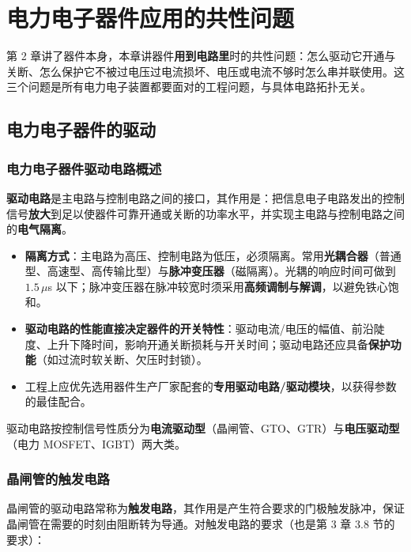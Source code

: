 \chapter{电力电子器件应用的共性问题}

第 2 章讲了器件本身，本章讲器件\textbf{用到电路里}时的共性问题：怎么驱动它开通与关断、怎么保护它不被过电压过电流损坏、电压或电流不够时怎么串并联使用。这三个问题是所有电力电子装置都要面对的工程问题，与具体电路拓扑无关。

\section{电力电子器件的驱动}

\subsection{电力电子器件驱动电路概述}

\textbf{驱动电路}是主电路与控制电路之间的接口，其作用是：把信息电子电路发出的控制信号\textbf{放大}到足以使器件可靠开通或关断的功率水平，并实现主电路与控制电路之间的\textbf{电气隔离}。

\begin{itemize}
  \item \textbf{隔离方式}：主电路为高压、控制电路为低压，必须隔离。常用\textbf{光耦合器}（普通型、高速型、高传输比型）与\textbf{脉冲变压器}（磁隔离）。光耦的响应时间可做到 $1.5\,\mu$s 以下；脉冲变压器在脉冲较宽时须采用\textbf{高频调制与解调}，以避免铁心饱和。
  \item \textbf{驱动电路的性能直接决定器件的开关特性}：驱动电流/电压的幅值、前沿陡度、上升下降时间，影响开通关断损耗与开关时间；驱动电路还应具备\textbf{保护功能}（如过流时软关断、欠压时封锁）。
  \item 工程上应优先选用器件生产厂家配套的\textbf{专用驱动电路/驱动模块}，以获得参数的最佳配合。
\end{itemize}

驱动电路按控制信号性质分为\textbf{电流驱动型}（晶闸管、GTO、GTR）与\textbf{电压驱动型}（电力 MOSFET、IGBT）两大类。

\subsection{晶闸管的触发电路}

晶闸管的驱动电路常称为\textbf{触发电路}，其作用是产生符合要求的门极触发脉冲，保证晶闸管在需要的时刻由阻断转为导通。对触发电路的要求（也是第 3 章 3.8 节的要求）：

